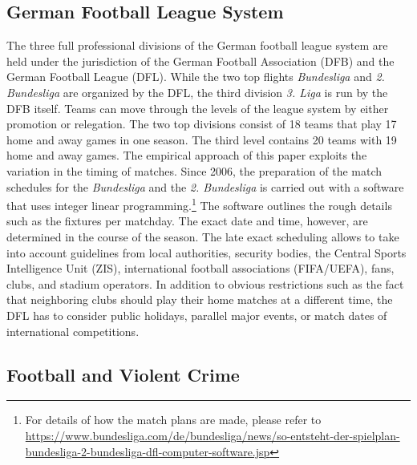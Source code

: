 \subsection{German Football League System}
The three full professional divisions of the German football league system are held under the jurisdiction of the German Football Association (DFB) and the German Football League (DFL). While the two top flights \textit{Bundesliga} and \textit{2. Bundesliga} are organized by the DFL, the third division \textit{3. Liga} is run by the DFB itself. Teams can move through the levels of the league system by either promotion or relegation. The two top divisions consist of 18 teams that play 17 home and away games in one season. The third level contains 20 teams with 19 home and away games. The empirical approach of this paper exploits the variation in the timing of matches. Since 2006, the preparation of the match schedules for the \textit{Bundesliga} and the \textit{2. Bundesliga} is carried out with a software that uses integer linear programming.\footnote{For details of how the match plans are made, please refer to \href{https://www.bundesliga.com/de/bundesliga/news/so-entsteht-der-spielplan-bundesliga-2-bundesliga-dfl-computer-software.jsp}{https://www.bundesliga.com/de/bundesliga/news/so-entsteht-der-spielplan-bundesliga-2-bundesliga-dfl-computer-software.jsp}} The software outlines the rough details such as the fixtures per matchday. The exact date and time, however, are determined in the course of the season. The late exact scheduling allows to take into account guidelines from local authorities, security bodies, the Central Sports Intelligence Unit (ZIS), international football associations (FIFA/UEFA), fans, clubs, and stadium operators. In addition to obvious restrictions such as the fact that neighboring clubs should play their home matches at a different time, the DFL has to consider public holidays, parallel major events, or match dates of international competitions.



\subsection{Football and Violent Crime}

